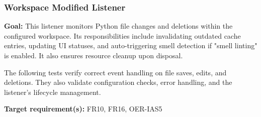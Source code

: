 \documentclass[12pt, titlepage]{article}
\begin{document}
\subsubsection{Workspace Modified Listener}

\textbf{Goal:} This listener monitors Python file changes and deletions within the configured workspace. Its responsibilities include invalidating outdated cache entries, updating UI statuses, and auto-triggering smell detection if "smell linting" is enabled. It also ensures resource cleanup upon disposal.

\medskip

\noindent The following tests verify correct event handling on file saves, edits, and deletions. They also validate configuration checks, error handling, and the listener's lifecycle management.

\medskip

\noindent\textbf{Target requirement(s):} FR10, FR16, OER-IAS5~\cite{SRS} \\
\end{document}
